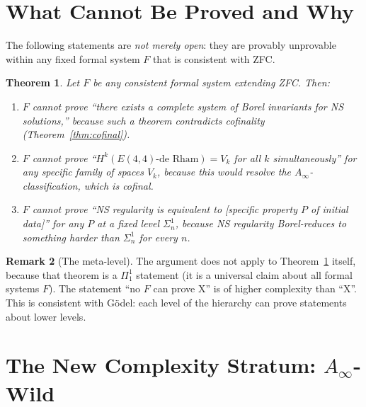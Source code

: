 \documentclass[reqno,10pt]{amsart}
\theoremstyle{plain}
\newtheorem{theorem}{Theorem}[section]
\theoremstyle{definition}
\newtheorem{remark}[theorem]{Remark}
\begin{document}
\section{What Cannot Be Proved and Why}\label{sec:cannot}

The following statements are \emph{not merely open}: they are provably
unprovable within any fixed formal system $F$ that is consistent with ZFC.

\begin{theorem}\label{thm:unprovable}
  Let $F$ be any consistent formal system extending ZFC.  Then:
  \begin{enumerate}
    \item[\rm(i)] $F$ cannot prove ``there exists a complete system of
          Borel invariants for NS solutions,'' because such a theorem
          contradicts cofinality (Theorem~\ref{thm:cofinal}).
    \item[\rm(ii)] $F$ cannot prove ``$H^k(E(4,4)\text{-de Rham}) = V_k$
          for all $k$ simultaneously'' for any specific family of spaces
          $V_k$, because this would resolve the $A_\infty$-classification,
          which is cofinal.
    \item[\rm(iii)] $F$ cannot prove ``NS regularity is equivalent to
          [specific property $P$ of initial data]'' for any $P$ at a fixed
          level $\Sigma_n^1$, because NS regularity Borel-reduces to
          something harder than $\Sigma_n^1$ for every $n$.
  \end{enumerate}
\end{theorem}

\begin{remark}[The meta-level]
  The argument does not apply to Theorem~\ref{thm:unprovable} itself,
  because that theorem is a $\Pi_1^1$ statement (it is a universal claim
  about all formal systems $F$).  The statement ``no $F$ can prove X'' is
  of higher complexity than ``X''.  This is consistent with Gödel: each
  level of the hierarchy can prove statements about lower levels.
\end{remark}

\section{The New Complexity Stratum: $A_\infty$-Wild}\label{sec:newstratum}
\end{document}
